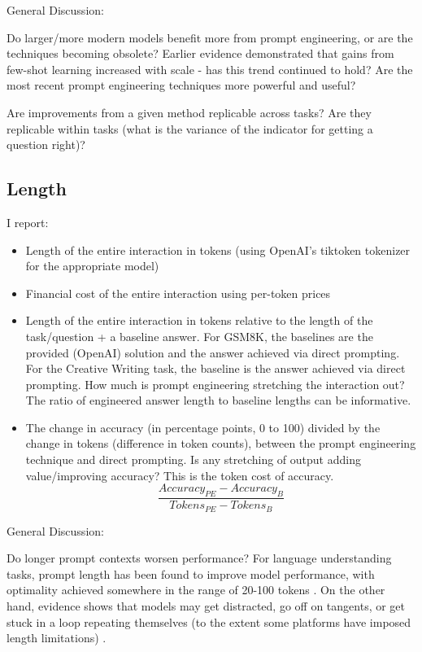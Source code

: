 \documentclass[11pt]{article}
\begin{document}
General Discussion:

Do larger/more modern models benefit more from prompt engineering, or are the techniques becoming obsolete? Earlier evidence demonstrated that gains from few-shot learning increased with scale - has this trend continued to hold? \cite{brown_language_2020} Are the most recent prompt engineering techniques more powerful and useful?

Are improvements from a given method replicable across tasks? Are they replicable within tasks (what is the variance of the indicator for getting a question right)?

\subsection*{Length}

I report:

\begin{itemize}
  \item Length of the entire interaction in tokens (using OpenAI's tiktoken tokenizer for the appropriate model)
  \item Financial cost of the entire interaction using per-token prices
  \item Length of the entire interaction in tokens relative to the length of the task/question + a baseline answer. For GSM8K, the baselines are the provided (OpenAI) solution and the answer achieved via direct prompting. For the Creative Writing task, the baseline is the answer achieved via direct prompting. How much is prompt engineering stretching the interaction out? The ratio of engineered answer length to baseline lengths can be informative.
  \item The change in accuracy (in percentage points, 0 to 100) divided by the change in tokens (difference in token counts), between the prompt engineering technique and direct prompting. Is any stretching of output adding value/improving accuracy? This is the token cost of accuracy.
  \begin{displaymath}
    \frac{Accuracy_{PE} - Accuracy_{B}}{Tokens_{PE} - Tokens_{B}}
  \end{displaymath}
\end{itemize}

General Discussion:

Do longer prompt contexts worsen performance? For language understanding tasks, prompt length has been found to improve model performance, with optimality achieved somewhere in the range of 20-100 tokens \cite{lester_power_2021}. On the other hand, evidence shows that models may get distracted, go off on tangents, or get stuck in a loop repeating themselves (to the extent some platforms have imposed length limitations) \cite{shi_large_2023, mann_microsoft_nodate}. 
\end{document}

